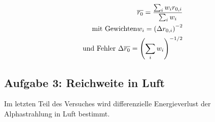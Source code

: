 \begin{enumerate}[label=\textbf{\alph*)}]
    \begin{subequations}\label{eq:weightmean}
    \begin{align}
		\overline{r_0} = \frac{\sum_i w_i r_{0,i}}{\sum_i w_i} \\
        \textnormal{mit Gewichten} w_i = \left( \Delta r_{0,i} \right)^{-2} \\\
        \textnormal{und Fehler } \Delta \overline{r_0} = \left( \sum_i w_i \right)^{-1/2}
    \end{align}
    \end{subequations}
\end{enumerate}

\subsection{Aufgabe 3: Reichweite in Luft}
Im letzten Teil des Versuches wird differenzielle Energieverlust der Alphastrahlung in Luft bestimmt.

